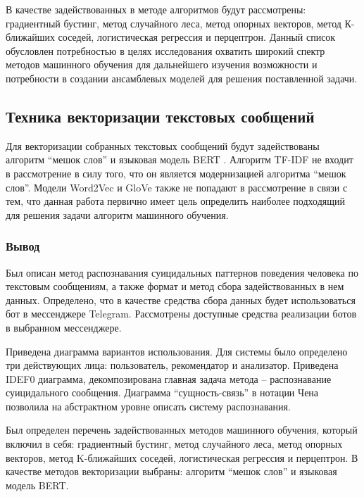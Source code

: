 В качестве задействованных в методе алгоритмов будут рассмотрены: градиентный бустинг, метод случайного леса, метод опорных векторов, метод К-ближайших соседей, логистическая регрессия и перцептрон. Данный список обусловлен потребностью в целях исследования охватить широкий спектр методов машинного обучения для дальнейшего изучения возможности и потребности в создании ансамблевых моделей для решения поставленной задачи.

\subsection{Техника векторизации текстовых сообщений}

Для векторизации собранных текстовых сообщений будут задействованы алгоритм ``мешок слов'' и языковая модель BERT \cite{bert}. Алгоритм TF-IDF не входит в рассмотрение в силу того, что он является модернизацией алгоритма ``мешок слов''. Модели Word2Vec \cite{word2vec} и GloVe \cite{glove} также не попадают в рассмотрение в связи с тем, что данная работа первично имеет цель определить наиболее подходящий для решения задачи алгоритм машинного обучения.

\subsubsection*{Вывод}

Был описан метод распознавания суицидальных паттернов поведения человека по текстовым сообщениям, а также формат и метод сбора задействованных в нем данных. 
Определено, что в качестве средства сбора данных будет использоваться бот в мессенджере Telegram. Рассмотрены доступные средства реализации ботов в выбранном мессенджере.

Приведена диаграмма вариантов использования. Для системы было определено три действующих лица: пользователь, рекомендатор и анализатор. 
Приведена IDEF0 диаграмма, декомпозирована главная задача метода -- распознавание суицидального сообщения. 
Диаграмма ``сущность-связь'' в нотации Чена позволила на абстрактном уровне описать систему распознавания. 

Был определен перечень задействованных методов машинного обучения, который включил в себя: градиентный бустинг, метод случайного леса, метод опорных векторов, метод K-ближайших соседей, логистическая регрессия и перцептрон. В качестве методов векторизации выбраны: алгоритм ``мешок слов'' и языковая модель BERT.



\pagebreak